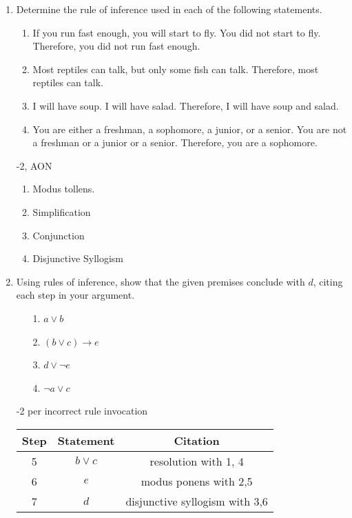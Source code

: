 \begin{enumerate}
    
\item Determine the rule of inference used in each of the following statements. 
\begin{enumerate}
    \item If you run fast enough, you will start to fly. You did not start to fly. Therefore, you did not run fast enough.
    \item Most reptiles can talk, but only some fish can talk. Therefore, most reptiles can talk.
    \item I will have soup. I will have salad. Therefore, I will have soup and salad.
    \item You are either a freshman, a sophomore, a junior, or a senior. You are not a freshman or a junior or a senior. Therefore, you are a sophomore.
\end{enumerate}

\begin{rubric}
-2, AON
\end{rubric}

\begin{solution}
\begin{enumerate}
    \item Modus tollens.
    \item Simplification
    \item Conjunction
    \item Disjunctive Syllogism
\end{enumerate}
\end{solution}

\item Using rules of inference, show that the given premises conclude with $d$, citing each step in your argument. 

\begin{enumerate}
    \item[1.] $a \lor b$
    \item[2.] $(b \lor c) \rightarrow e$
    \item[3.] $d \lor \neg e$
    \item[4.] $\neg a \lor c$
\end{enumerate}

\begin{rubric}
-2 per incorrect rule invocation
\end{rubric}

\begin{solution}
\begin{center}
\begin{tabular}{c|c|c}
    Step & Statement & Citation\\
    \hline
    5 & $b \lor c$ & resolution with 1, 4 \\
    6 & $e$ & modus ponens with 2,5 \\
    7 & $d$ & disjunctive syllogism with 3,6\\
\end{tabular}
\end{center}
\end{solution}


\end{enumerate}
